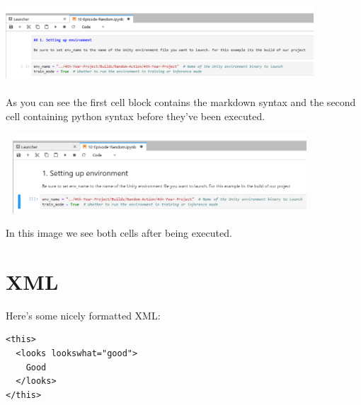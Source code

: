 \begin{center}
\vspace{4mm}
	\includegraphics[width=115mm, height=30mm]{img/Notebook1.PNG}
\vspace{4mm}
\end{center}

\begin{flushleft}
As you can see the first cell block contains the markdown syntax and the second cell containing python syntax before they’ve been executed.
\end{flushleft}

\begin{center}
\vspace{4mm}
	\includegraphics[width=115mm, height=30mm]{img/Notebook2.PNG}
\vspace{4mm}
\end{center}

\begin{flushleft}
In this image we see both cells after being executed. 
\end{flushleft}


\section{XML}
Here's some nicely formatted XML:
\begin{verbatim}
<this>
  <looks lookswhat="good">
    Good
  </looks>
</this>
\end{verbatim}
